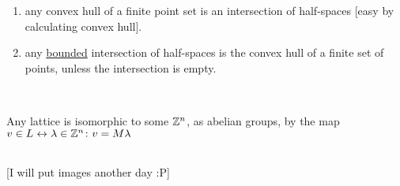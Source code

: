 \begin{enumerate}\item any convex hull of a finite point set is an intersection of half-spaces [easy by calculating convex hull].\\
\item any \underline{bounded} intersection of half-spaces is the convex hull of a finite set of points, unless the intersection is empty.\end{enumerate}\mbox{ }

Any lattice is isomorphic to some $\mathbb{Z}^n$, as abelian groups, by the map $v\in{}L\leftrightarrow\lambda\in\mathbb{Z}^n\colon{}v=M\lambda$

\mbox{ }\\[1.1cm]
[I will put images another day :P]

 